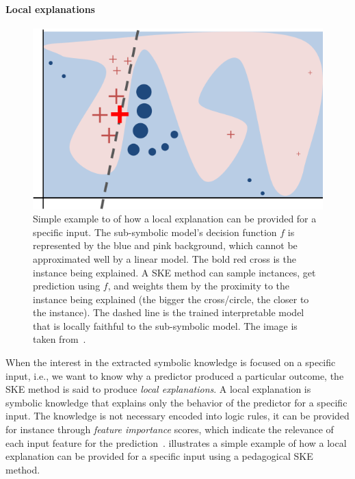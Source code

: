 \paragraph{Local explanations}\label{par:local-explanations}
%
\begin{figure}
    \centering
    \includegraphics[width=.6\linewidth]{figures/local-explanation}
    \caption[Local explanations]{
        Simple example to of how a local explanation can be provided for a specific input.
        The sub-symbolic model's decision function $f$ is represented by the blue and pink background, which cannot be approximated well by a linear model.
        The bold red cross is the instance being explained.
        A \gls{SKE} method can sample inctances, get prediction using $f$, and weights them by the proximity to the instance being explained (the bigger the cross/circle, the closer to the instance).
        The dashed line is the trained interpretable model that is locally faithful to the sub-symbolic model.
        The image is taken from~\cite{DBLP:conf/kdd/Ribeiro0G16}.
    }
    \label{fig:local-explanations}
\end{figure}
%
When the interest in the extracted symbolic knowledge is focused on a specific input, i.e., we want to know why a predictor produced a particular outcome, the \gls{SKE} method is said to produce \emph{local explanations}.
%
A local explanation is symbolic knowledge that explains only the behavior of the predictor for a specific input.
%
The knowledge is not necessary encoded into logic rules, it can be provided for instance through \emph{feature importance} scores, which indicate the relevance of each input feature for the prediction~\cite{DBLP:conf/kdd/Ribeiro0G16}.
%
 illustrates a simple example of how a local explanation can be provided for a specific input using a pedagogical \gls{SKE} method.


